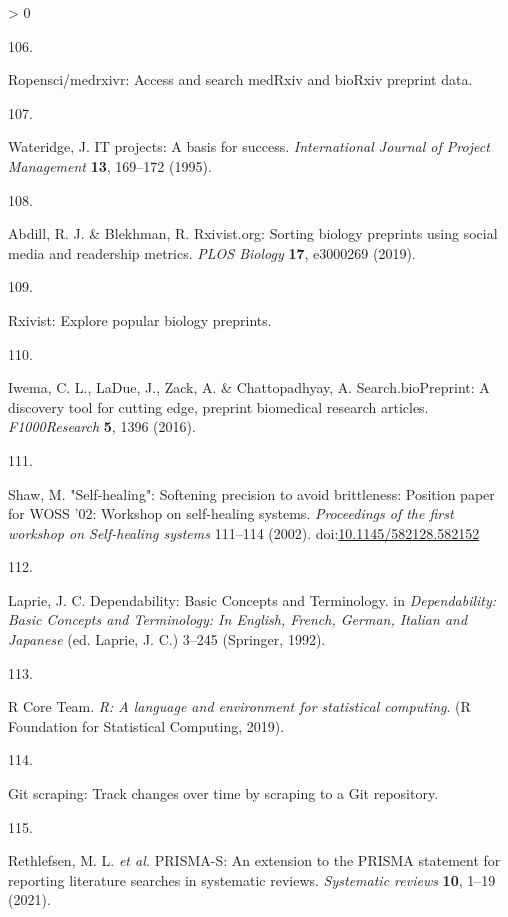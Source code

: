 \documentclass[a4paper, twoside]{templates/ociamthesis}
\newlength{\cslhangindent}
\newlength{\csllabelwidth}
\newenvironment{CSLReferences}[3] %
 {%
  \setlength{\parindent}{0pt}
  \ifodd #1 \everypar{\setlength{\hangindent}{\cslhangindent}}\ignorespaces\fi
  \ifnum #2 > 0
  \setlength{\parskip}{#2\baselineskip}
  \fi
 }%
 {}
\newcommand{\CSLLeftMargin}[1]{\parbox[t]{\maxof{\widthof{#1}}{\csllabelwidth}}{#1}}
\newcommand{\CSLRightInline}[1]{\parbox[t]{\linewidth - \csllabelwidth}{#1}}
\begin{document}
\begin{CSLReferences}{0}{0}
\leavevmode\hypertarget{ref-zotero-15029}{}%
\CSLLeftMargin{106. }
\CSLRightInline{Ropensci/medrxivr: Access and search {medRxiv} and {bioRxiv} preprint data.}

\leavevmode\hypertarget{ref-wateridge1995}{}%
\CSLLeftMargin{107. }
\CSLRightInline{Wateridge, J. {IT} projects: A basis for success. \emph{International Journal of Project Management} \textbf{13}, 169--172 (1995).}

\leavevmode\hypertarget{ref-abdill2019}{}%
\CSLLeftMargin{108. }
\CSLRightInline{Abdill, R. J. \& Blekhman, R. Rxivist.org: Sorting biology preprints using social media and readership metrics. \emph{PLOS Biology} \textbf{17}, e3000269 (2019).}

\leavevmode\hypertarget{ref-zotero-15027}{}%
\CSLLeftMargin{109. }
\CSLRightInline{Rxivist: Explore popular biology preprints.}

\leavevmode\hypertarget{ref-iwema2016}{}%
\CSLLeftMargin{110. }
\CSLRightInline{Iwema, C. L., LaDue, J., Zack, A. \& Chattopadhyay, A. Search.{bioPreprint}: A discovery tool for cutting edge, preprint biomedical research articles. \emph{F1000Research} \textbf{5}, 1396 (2016).}

\leavevmode\hypertarget{ref-shaw2002}{}%
\CSLLeftMargin{111. }
\CSLRightInline{Shaw, M. "{Self}-healing": Softening precision to avoid brittleness: Position paper for {WOSS} '02: Workshop on self-healing systems. \emph{Proceedings of the first workshop on Self-healing systems} 111--114 (2002). doi:\href{https://doi.org/10.1145/582128.582152}{10.1145/582128.582152}}

\leavevmode\hypertarget{ref-laprie1992}{}%
\CSLLeftMargin{112. }
\CSLRightInline{Laprie, J. C. Dependability: Basic {Concepts} and {Terminology}. in \emph{Dependability: Basic {Concepts} and {Terminology}: In {English}, {French}, {German}, {Italian} and {Japanese}} (ed. Laprie, J. C.) 3--245 ({Springer}, 1992).}

\leavevmode\hypertarget{ref-rcoreteam2019}{}%
\CSLLeftMargin{113. }
\CSLRightInline{R Core Team. \emph{R: A language and environment for statistical computing}. ({R Foundation for Statistical Computing}, 2019).}

\leavevmode\hypertarget{ref-zotero-15031}{}%
\CSLLeftMargin{114. }
\CSLRightInline{Git scraping: Track changes over time by scraping to a {Git} repository.}

\leavevmode\hypertarget{ref-rethlefsen2021prisma}{}%
\CSLLeftMargin{115. }
\CSLRightInline{Rethlefsen, M. L. \emph{et al.} {PRISMA}-{S}: An extension to the {PRISMA} statement for reporting literature searches in systematic reviews. \emph{Systematic reviews} \textbf{10}, 1--19 (2021).}


\end{CSLReferences}
\end{document}
